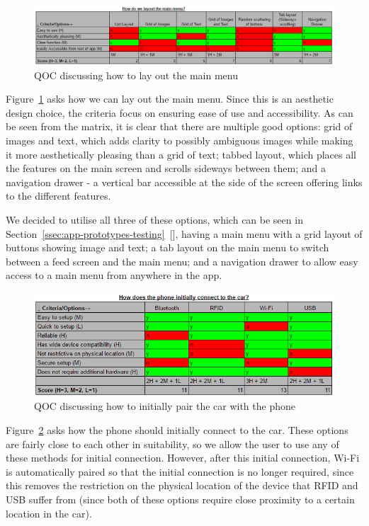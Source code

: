 \documentclass{article}
\begin{document}
\begin{figure}[H]
  \centering
  \includegraphics[scale=0.6]{qoc-app-menu}
  \caption{QOC discussing how to lay out the main menu}\label{qoc-app-menu}
\end{figure}

Figure~\ref{qoc-app-menu} asks how we can lay out the main menu. Since this is an aesthetic design choice, the criteria focus on ensuring ease of use and accessibility. As can be seen from the matrix, it is clear that there are multiple good options: grid of images and text, which adds clarity to possibly ambiguous images while making it more aesthetically pleasing than a grid of text; tabbed layout, which places all the features on the main screen and scrolls sideways between them; and a navigation drawer - a vertical bar accessible at the side of the screen offering links to the different features.

We decided to utilise all three of these options, which can be seen in Section~\ref{ssec:app-prototypes-testing}~[], having a main menu with a grid layout of buttons showing image and text; a tab layout on the main menu to switch between a feed screen and the main menu; and a navigation drawer to allow easy access to a main menu from anywhere in the app.

\begin{figure}[H]
  \centering
  \includegraphics[scale=0.8]{qoc-app-connect}
  \caption{QOC discussing how to initially pair the car with the phone}\label{qoc-app-connect}
\end{figure}

Figure~\ref{qoc-app-connect} asks how the phone should initially connect to the car. These options are fairly close to each other in suitability, so we allow the user to use any of these methods for initial connection. However, after this initial connection, Wi-Fi is automatically paired so that the initial connection is no longer required, since this removes the restriction on the physical location of the device that RFID and USB suffer from (since both of these options require close proximity to a certain location in the car).
\end{document}
